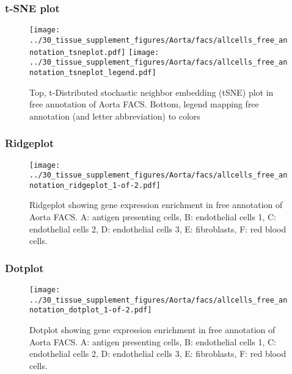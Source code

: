 \newpage
\subsubsection{t-SNE plot}
\begin{figure}[h]
\centering
\texttt{[image: ../30\_tissue\_supplement\_figures/Aorta/facs/allcells\_free\_annotation\_tsneplot.pdf]}
\texttt{[image: ../30\_tissue\_supplement\_figures/Aorta/facs/allcells\_free\_annotation\_tsneplot\_legend.pdf]}
\caption{Top, t-Distributed stochastic neighbor embedding (tSNE) plot  in free annotation of Aorta FACS. Bottom, legend mapping free annotation (and letter abbreviation) to colors}
\end{figure}


\newpage
\newpage
\subsubsection{Ridgeplot}
\begin{figure}[h]
\centering
\texttt{[image: ../30\_tissue\_supplement\_figures/Aorta/facs/allcells\_free\_annotation\_ridgeplot\_1-of-2.pdf]}

\caption{ Ridgeplot  showing gene expression enrichment in free annotation of Aorta FACS. A: antigen presenting cells, B: endothelial cells 1, C: endothelial cells 2, D: endothelial cells 3, E: fibroblasts, F: red blood cells.}
\end{figure}


\newpage
\newpage
\subsubsection{Dotplot}
\begin{figure}[h]
\centering
\texttt{[image: ../30\_tissue\_supplement\_figures/Aorta/facs/allcells\_free\_annotation\_dotplot\_1-of-2.pdf]}

\caption{ Dotplot  showing gene expression enrichment in free annotation of Aorta FACS. A: antigen presenting cells, B: endothelial cells 1, C: endothelial cells 2, D: endothelial cells 3, E: fibroblasts, F: red blood cells.}
\end{figure}

